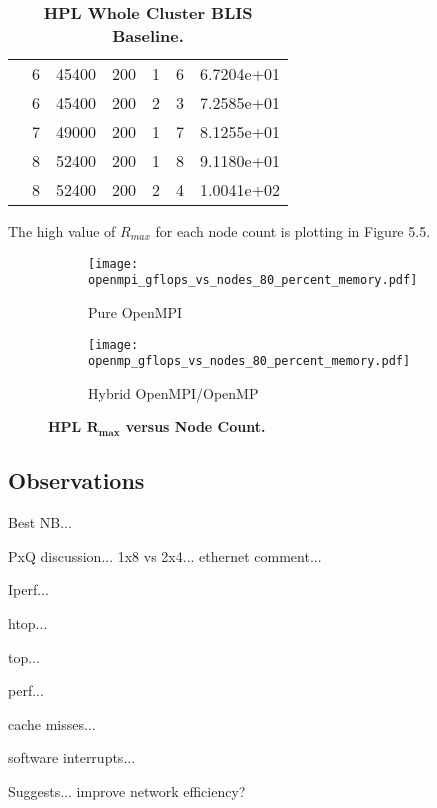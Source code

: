 \begin{table}
\begin{center}
\begin{tabular}{ |l|c|c|c|c|c|c| }
                & 6 & 45400 & 200 & 1 & 6 & 6.7204e+01 \\ 
                & 6 & 45400 & 200 & 2 & 3 & 7.2585e+01 \\ 
                \cline{2-7} 
                & 7 & 49000 & 200 & 1 & 7 & 8.1255e+01 \\ 
                \cline{2-7} 
                & 8 & 52400 & 200 & 1 & 8 & 9.1180e+01 \\ 
                & 8 & 52400 & 200 & 2 & 4 & 1.0041e+02 \\ 
\hline
\end{tabular}
\end{center}
\caption{\label{tab:table-name}\textbf{HPL Whole Cluster BLIS Baseline.}}
\end{table}



The high value of $R_{max}$ for each node count is plotting in Figure 5.5.

\begin{figure}[H]
	\begin{subfigure}{1.0\textwidth}
		\centering
		\texttt{[image: openmpi\_gflops\_vs\_nodes\_80\_percent\_memory.pdf]}
		\caption{Pure OpenMPI}
		\label{fig:subim1}
	\end{subfigure}
	\par\bigskip
	\begin{subfigure}{1.0\textwidth}
		\centering
		\texttt{[image: openmp\_gflops\_vs\_nodes\_80\_percent\_memory.pdf]}
		\caption{Hybrid OpenMPI/OpenMP}
		\label{fig:subim2}
	\end{subfigure}
\caption{\textbf{HPL $\mathbf{R_{max}}$ versus Node Count.}}
\label{fig:image2}
\end{figure}


%
%
\subsection{Observations}

Best NB...

PxQ discussion... 1x8 vs 2x4... ethernet comment...

Iperf...

htop...

top...

perf...

cache misses...

software interrupts...

Suggests... improve network efficiency?



